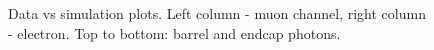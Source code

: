 \begin{figure}[htb]
\begin{center}
  \caption{Data vs simulation plots. Left column - muon channel, right column - electron. Top to bottom: barrel and endcap photons.}
  \label{fig:DATAvsMC}
  \end{center}
\end{figure}



